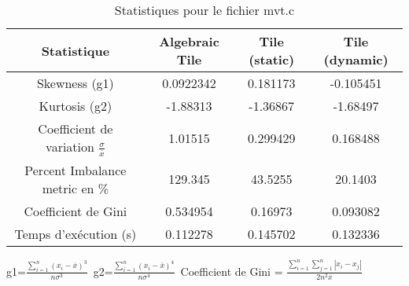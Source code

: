 \documentclass{article}
\begin{document}
\begin{table}[htbp]
  \centering
  \caption{Statistiques pour le fichier mvt.c}
  \begin{tabular}{|c|c|c|c|}
    \hline
    Statistique & Algebraic Tile & Tile (static) & Tile (dynamic) \\ 
    \hline
    Skewness (g1)  & 0.0922342 & 0.181173 & -0.105451 \\ 
    Kurtosis (g2)  & -1.88313 & -1.36867 & -1.68497 \\ 
    Coefficient de variation $ \frac{\sigma}{\overline{x}} $ & 1.01515 & 0.299429 & 0.168488\\ 
    Percent Imbalance metric en \% & 129.345 & 43.5255 & 20.1403\\ 
    Coefficient de Gini  & 0.534954 & 0.16973 & 0.093082\\ 
    Temps d'exécution (s) &  0.112278    &  0.145702   &  0.132336   \\ 

    \hline
  \end{tabular}
\end{table}
g1=$ \frac{\sum_{i=1}^{n} (x_i - \overline{x})^3}{n\sigma^3} $\
g2=$ \frac{\sum_{i=1}^{n} (x_i - \overline{x})^4}{n\sigma^4} $\
Coefficient de Gini = $ \frac{\sum_{i=1}^{n}\sum_{j=1}^{n} |x_i - x_j|}{2n^2\overline{x}} $\
\newpage
\end{document}
